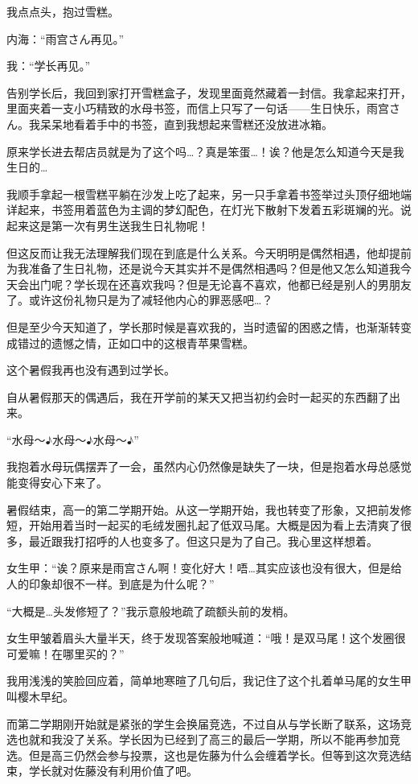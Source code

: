 我点点头，抱过雪糕。

内海：“雨宫さん再见。”

我：“学长再见。”

告别学长后，我回到家打开雪糕盒子，发现里面竟然藏着一封信。我拿起来打开，里面夹着一支小巧精致的水母书签，而信上只写了一句话——生日快乐，雨宫さん。我呆呆地看着手中的书签，直到我想起来雪糕还没放进冰箱。

原来学长进去帮店员就是为了这个吗…？真是笨蛋…！诶？他是怎么知道今天是我生日的…

我顺手拿起一根雪糕平躺在沙发上吃了起来，另一只手拿着书签举过头顶仔细地端详起来，书签用着蓝色为主调的梦幻配色，在灯光下散射下发着五彩斑斓的光。说起来这是第一次有男生送我生日礼物呢！

但这反而让我无法理解我们现在到底是什么关系。今天明明是偶然相遇，他却提前为我准备了生日礼物，还是说今天其实并不是偶然相遇吗？但是他又怎么知道我今天会出门呢？学长现在还喜欢我吗？但是无论喜不喜欢，他都已经是别人的男朋友了。或许这份礼物只是为了减轻他内心的罪恶感吧…？

但是至少今天知道了，学长那时候是喜欢我的，当时遗留的困惑之情，也渐渐转变成错过的遗憾之情，正如口中的这根青苹果雪糕。

这个暑假我再也没有遇到过学长。

\cutlineg{\timepast}



自从暑假那天的偶遇后，我在开学前的某天又把当初约会时一起买的东西翻了出来。

\newday{\cloudy}

“水母～$\eighthnote$水母～$\eighthnote$水母～$\eighthnote$”

我抱着水母玩偶摆弄了一会，虽然内心仍然像是缺失了一块，但是抱着水母总感觉能变得安心下来了。

暑假结束，高一的第二学期开始。从这一学期开始，我也转变了形象，又把前发修短，开始用着当时一起买的毛绒发圈扎起了低双马尾。大概是因为看上去清爽了很多，最近跟我打招呼的人也变多了。但这只是为了自己。我心里这样想着。

女生甲：“诶？原来是雨宫さん啊！变化好大！唔…其实应该也没有很大，但是给人的印象却很不一样。到底是为什么呢？”

“大概是…头发修短了？”我示意般地疏了疏额头前的发梢。

女生甲皱着眉头大量半天，终于发现答案般地喊道：“哦！是双马尾！这个发圈很可爱嘛！在哪里买的？”

我用浅浅的笑脸回应着，简单地寒暄了几句后，我记住了这个扎着单马尾的女生甲叫樱木早纪。

而第二学期刚开始就是紧张的学生会换届竞选，不过自从与学长断了联系，这场竞选也就和我没了关系。学长因为已经到了高三的最后一学期，所以不能再参加竞选。但是高三仍然会参与投票，这也是佐藤为什么会缠着学长。但等到这次竞选结束，学长就对佐藤没有利用价值了吧。

